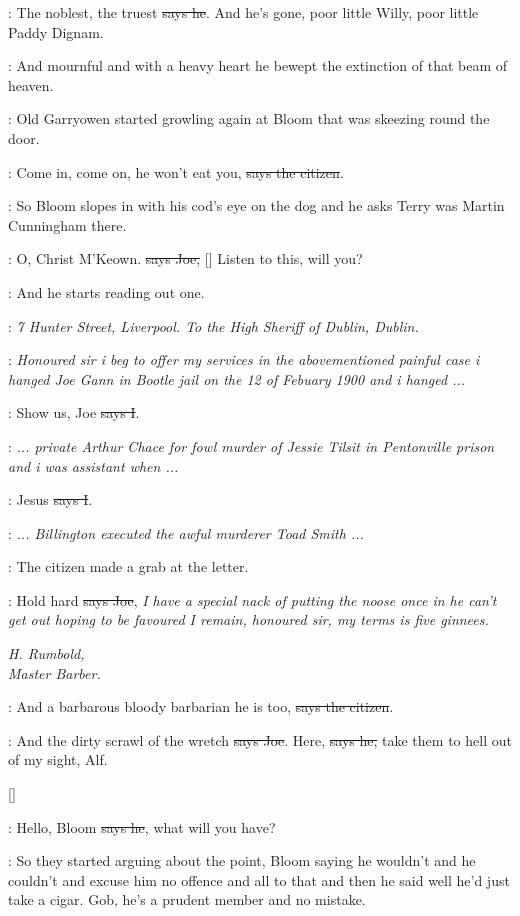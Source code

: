 \doran:
The noblest, the truest \sout{says he}.
And he's gone, poor little Willy, poor
little Paddy Dignam.

:
And mournful and with a heavy heart he bewept the extinction of that
beam of heaven.

\Nq:
Old Garryowen started growling again at Bloom that was skeezing
round the door.

\citizen:
Come in, come on, he won't eat you,
\sout{says the citizen}.

\Nq:
So Bloom slopes in with his cod's eye on the dog and he asks Terry
was Martin Cunningham there.

\joe:
O, Christ M'Keown. \sout{says Joe,}
[]
Listen to this, will you?

\Nq:
And he starts reading out one.


\joe:
                \emph{7 Hunter Street, Liverpool.
        To the High Sheriff of Dublin, Dublin.}

\joe:
    \emph{Honoured sir i beg to offer my services in the abovementioned painful
case i hanged Joe Gann in Bootle jail on the 12 of Febuary 1900 and i
hanged ...}

:
Show us, Joe \sout{says I}.

\joe:
 \emph{... private Arthur Chace for fowl murder of Jessie Tilsit in
Pentonville prison and i was assistant when ...}

:
Jesus \sout{says I}.

\joe:
 \emph{... Billington executed the awful murderer Toad Smith ...}

\Nq:
The citizen made a grab at the letter.

\joe:
Hold hard \sout{says Joe},
\emph{I have a special nack of putting the noose once in
he can't get out hoping to be favoured I remain, honoured sir, my terms is
five ginnees.}

\emph{H. Rumbold, \\
Master Barber.}

\citizen:
And a barbarous bloody barbarian he is too,
\sout{says the citizen}.

\joe:
And the dirty scrawl of the wretch \sout{says Joe}.
Here, \sout{says he,} take them
to hell out of my sight, Alf.

[]

\joe:
Hello, Bloom \sout{says he}, what will you have?

\Nq:
So they started arguing about the point, Bloom saying he wouldn't
and he couldn't and excuse him no offence and all to that and then he said
well he'd just take a cigar. Gob, he's a prudent member and no mistake.


